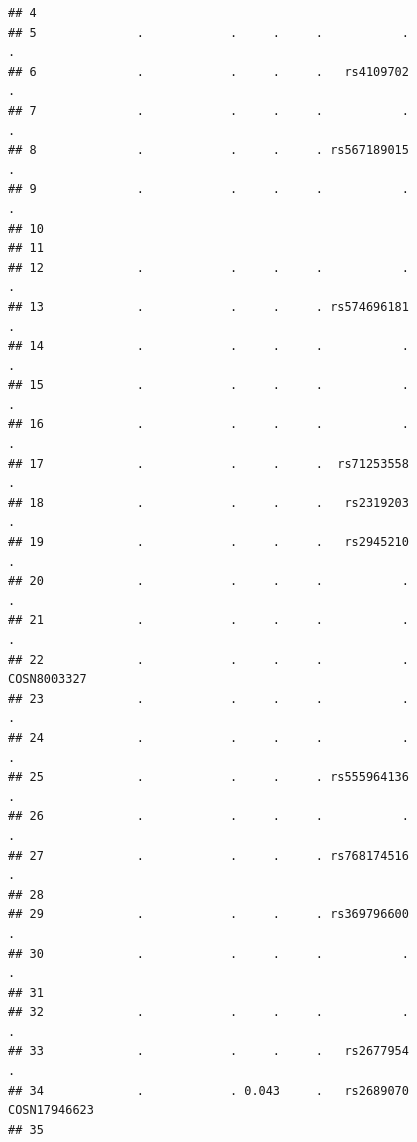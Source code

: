 \documentclass[
]{article}
\begin{document}
\begin{verbatim}
## 4                                                                             
## 5              .            .     .     .           .                        .
## 6              .            .     .     .   rs4109702                        .
## 7              .            .     .     .           .                        .
## 8              .            .     .     . rs567189015                        .
## 9              .            .     .     .           .                        .
## 10                                                                            
## 11                                                                            
## 12             .            .     .     .           .                        .
## 13             .            .     .     . rs574696181                        .
## 14             .            .     .     .           .                        .
## 15             .            .     .     .           .                        .
## 16             .            .     .     .           .                        .
## 17             .            .     .     .  rs71253558                        .
## 18             .            .     .     .   rs2319203                        .
## 19             .            .     .     .   rs2945210                        .
## 20             .            .     .     .           .                        .
## 21             .            .     .     .           .                        .
## 22             .            .     .     .           .              COSN8003327
## 23             .            .     .     .           .                        .
## 24             .            .     .     .           .                        .
## 25             .            .     .     . rs555964136                        .
## 26             .            .     .     .           .                        .
## 27             .            .     .     . rs768174516                        .
## 28                                                                            
## 29             .            .     .     . rs369796600                        .
## 30             .            .     .     .           .                        .
## 31                                                                            
## 32             .            .     .     .           .                        .
## 33             .            .     .     .   rs2677954                        .
## 34             .            . 0.043     .   rs2689070             COSN17946623
## 35                                                                            

\end{verbatim}
\end{document}
